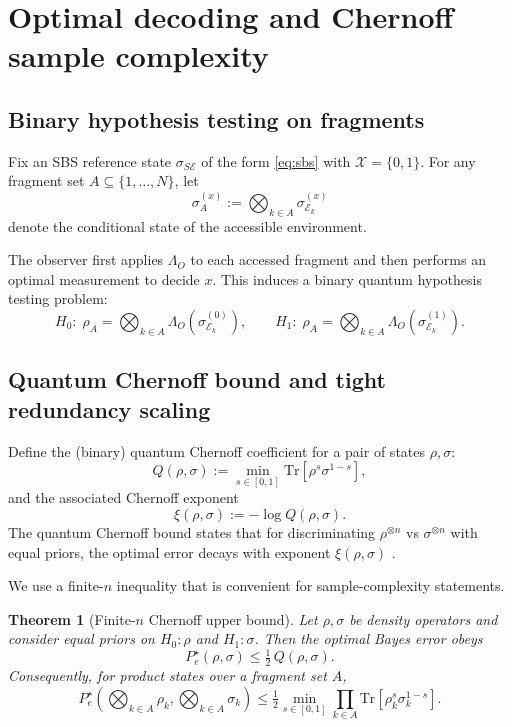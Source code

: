 \documentclass[11pt]{article}
\newcommand{\cE}{\mathcal{E}}
\newcommand{\cX}{\mathcal{X}}
\newcommand{\1}{\mathbf{1}}
\newcommand{\QCBcoef}{Q}
\newcommand{\QCBdist}{\xi}
\theoremstyle{definition}
\theoremstyle{plain}
\newtheorem{theorem}{Theorem}
\begin{document}
\section{Optimal decoding and Chernoff sample complexity}

\subsection{Binary hypothesis testing on fragments}

Fix an SBS reference state $\sigma_{S\cE}$ of the form \eqref{eq:sbs} with $\cX=\{0,1\}$.
For any fragment set $A\subseteq\{1,\dots,N\}$, let
\[
\sigma^{(x)}_{A}:=\bigotimes_{k\in A}\sigma^{(x)}_{\cE_k}
\]
denote the conditional state of the accessible environment.

The observer first applies $\Lambda_O$ to each accessed fragment and then performs an optimal measurement to decide $x$.
This induces a binary quantum hypothesis testing problem:
\[
H_0:\;\rho_A=\bigotimes_{k\in A}\Lambda_O(\sigma^{(0)}_{\cE_k}),
\qquad
H_1:\;\rho_A=\bigotimes_{k\in A}\Lambda_O(\sigma^{(1)}_{\cE_k}).
\]

\subsection{Quantum Chernoff bound and tight redundancy scaling}

Define the (binary) quantum Chernoff coefficient for a pair of states $\rho,\sigma$:
\[
\QCBcoef(\rho,\sigma):=\min_{s\in[0,1]}\mathrm{Tr}\left[\rho^s\sigma^{1-s}\right],
\]
and the associated Chernoff exponent
\[
\QCBdist(\rho,\sigma):=-\log \QCBcoef(\rho,\sigma).
\]
The quantum Chernoff bound states that for discriminating $\rho^{\otimes n}$ vs $\sigma^{\otimes n}$ with equal priors, the optimal error decays with exponent $\QCBdist(\rho,\sigma)$ \citep{Audenaert2007,NussbaumSzkola2009}.

We use a finite-$n$ inequality that is convenient for sample-complexity statements.

\begin{theorem}[Finite-$n$ Chernoff upper bound]
\label{thm:chernoff-upper}
Let $\rho,\sigma$ be density operators and consider equal priors on $H_0:\rho$ and $H_1:\sigma$.
Then the optimal Bayes error obeys
\begin{equation}
P_e^\star(\rho,\sigma)\le \tfrac12\, \QCBcoef(\rho,\sigma).
\label{eq:pe-qcb}
\end{equation}
Consequently, for product states over a fragment set $A$,
\[
P_e^\star\!\left(\bigotimes_{k\in A}\rho_k,\bigotimes_{k\in A}\sigma_k\right)
\le \tfrac12 \min_{s\in[0,1]} \prod_{k\in A}\mathrm{Tr}\!\left[\rho_k^s\sigma_k^{1-s}\right].
\]
\end{theorem}
\end{document}
